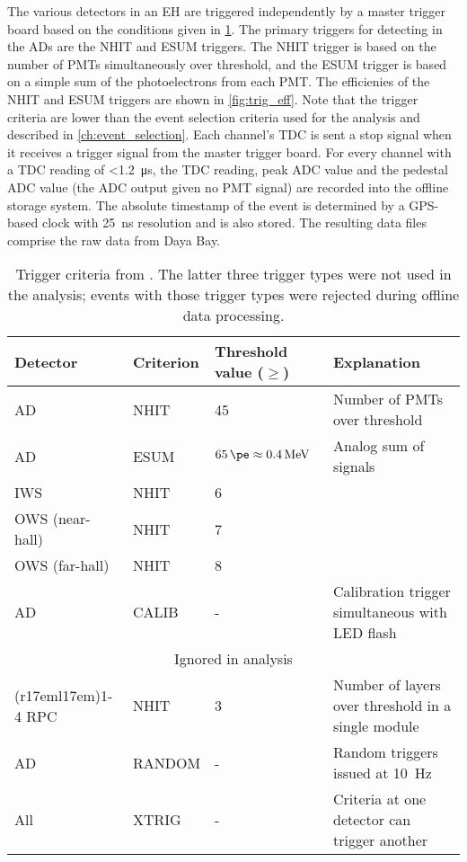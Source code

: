 The various detectors in an EH are triggered independently
by a master trigger board based on the conditions given in \cref{tab:trigger}.
The primary triggers for detecting \nuebar{} in the ADs are the NHIT and ESUM triggers.
The NHIT trigger is based on the number of PMTs simultaneously over threshold,
and the ESUM trigger is based on a simple sum of the photoelectrons
from each PMT.
The efficienies of the NHIT and ESUM triggers are shown in \cref{fig:trig_eff}.
Note that the trigger criteria are lower than the event selection
criteria used for the \thetaot{} analysis and described in \cref{ch:event_selection}.
Each channel's TDC is sent a stop signal when it receives a trigger signal
from the master trigger board.
For every channel with a TDC reading of \SI{<1.2}{\us},
the TDC reading, peak ADC value and the pedestal ADC value
(the ADC output given no PMT signal)
are recorded into the offline storage system.
The absolute timestamp of the event is determined by a GPS-based clock
with \SI{25}{\ns} resolution and is also stored.
The resulting data files comprise the raw data from Daya Bay.


\begin{table}[ht]
    \centering
    \begin{tabular}[t]{lllp{6cm}}
        \toprule
        Detector & Criterion & Threshold value ($\geq$) & Explanation\\
        \midrule
        AD & NHIT & \num{45} & Number of PMTs over threshold \\
        AD & ESUM & $\SI{65}{\pe}\approx \SI{0.4}{\MeV}$ & Analog sum of signals \\
        IWS & NHIT & \num{6} & \\
        OWS (near-hall) & NHIT & \num{7} & \\
        OWS (far-hall) & NHIT & \num{8} & \\
        AD & CALIB & - & Calibration trigger simultaneous with LED flash \\
        \midrule
        \multicolumn{4}{c}{Ignored in \thetaot{} analysis} \\
        \cmidrule(r{17em}l{17em}){1-4}
        RPC & NHIT & \num{3} & Number of layers over threshold in a single module \\
        AD & RANDOM & - & Random triggers issued at \SI{10}{\Hz} \\
        All & XTRIG & - & Criteria at one detector can trigger another \\
        \bottomrule
    \end{tabular}
    \caption{
        Trigger criteria from \cite{ngd2016}.
        The latter three trigger types were not used in the \thetaot{} analysis;
        events with those trigger types were rejected
        during offline data processing.
    }
    \label{tab:trigger}
\end{table}

